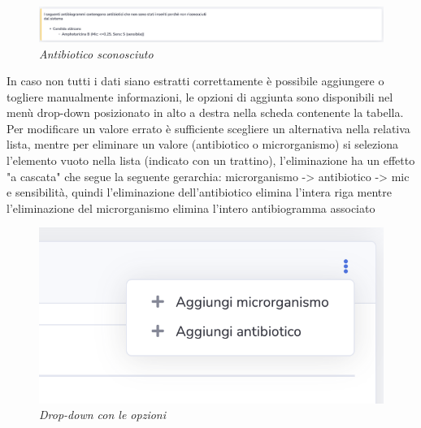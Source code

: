 \begin{figure}[h!]
	\centering
	\includegraphics[width=.99\columnwidth]{images/static_missing_antib.png}
	\caption{\textit{Antibiotico sconosciuto}}
	\label{fig:missing_anti}
\end{figure}
\newpage
In caso non tutti i dati siano estratti correttamente è possibile aggiungere o togliere manualmente informazioni, le opzioni di aggiunta sono disponibili nel menù drop-down posizionato in alto a destra nella scheda contenente la tabella.
Per modificare un valore errato è sufficiente scegliere un alternativa nella relativa lista, mentre per eliminare un valore (antibiotico o microrganismo) si seleziona l'elemento vuoto nella lista (indicato con un trattino), l'eliminazione ha un effetto 
"a cascata" che segue la seguente gerarchia: microrganismo -> antibiotico -> mic e sensibilità, quindi l'eliminazione dell'antibiotico elimina l'intera riga mentre l'eliminazione del microrganismo elimina l'intero antibiogramma associato
\begin{figure}[h!]
	\centering
	\includegraphics[width=.99\columnwidth]{images/new_object.png}
	\caption{\textit{Drop-down con le opzioni}}
	\label{fig:new_object}
\end{figure}